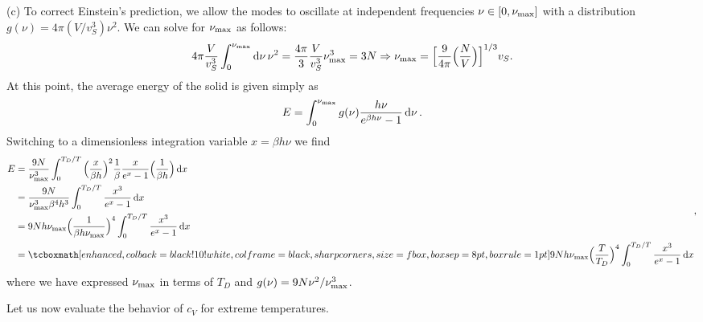 {(c) To correct Einstein's prediction, we allow the modes to oscillate at independent frequencies $\nu \in [0,\nu_{\rm max}]$ with a distribution $g(\nu) = 4 \pi (V/v_{S}^3) \nu^2$.
We can solve for $\nu_{\rm max}$ as follows:
\begin{eqnarray}
    4 \pi \frac{V}{v_{S}^3} \int_{0}^{\nu_{\rm max}} \dd{\nu} \nu^2 = \frac{4 \pi}{3} \frac{V}{v_{S}^3} \nu_{\rm max}^3 = 3 N \Rightarrow \nu_{\rm max} = \Big[ \frac{9}{4 \pi} \Big( \frac{N}{V} \Big) \Big]^{1/3} v_{S}
.\end{eqnarray}
At this point, the average energy of the solid is given simply as 
\begin{eqnarray}
    E = \int_{0}^{\nu_{\rm max}} g(\nu) \frac{h \nu}{e^{\beta h \nu} - 1} \dd{\nu}
.\end{eqnarray}
Switching to a dimensionless integration variable $x = \beta h \nu$ we find
\begin{eqnarray}
    \begin{aligned}
        E &= \frac{9 N}{\nu_{\rm max}^3} \int_{0}^{T_{D}/T} \Big( \frac{x}{\beta h} \Big)^2 \frac{1}{\beta} \frac{x}{e^{x} - 1} \Big( \frac{1}{\beta h} \Big) \dd{x} \\
          &= \frac{9 N}{\nu_{\rm max}^3 \beta^{4} h^3} \int_{0}^{T_{D}/T} \frac{x^3}{e^{x}-1} \dd{x} \\
          &= 9 N h \nu_{\rm max} \Big( \frac{1}{\beta h \nu_{\rm max}} \Big)^{4} \int_{0}^{T_{D}/T} \frac{x^3}{e^{x} - 1} \dd{x} \\
          &= \eqbox{9 N h \nu_{\rm max} \Big( \frac{T}{T_{D}} \Big)^{4} \int_{0}^{T_{D}/T} \frac{x^3}{e^{x} - 1} \dd{x} }
    \end{aligned}
,\end{eqnarray}
where we have expressed $\nu_{\rm max}$ in terms of $T_{D}$ and $g(\nu) = 9 N \nu^2 / \nu_{\rm max}^3$.

Let us now evaluate the behavior of $c_{V}$ for extreme temperatures.

}
